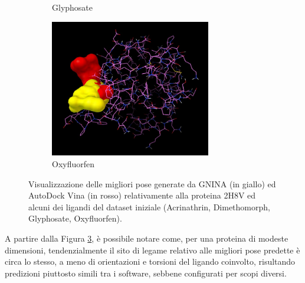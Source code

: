 \begin{figure}[H]
\begin{subfigure}[b]{0.475\textwidth}
        \caption[]%
        {{\small Glyphosate}}    
        \label{fig:2h8v_glyphosate}
    \end{subfigure}
    \hfill
    \begin{subfigure}[b]{0.475\textwidth}   
        \centering 
        \includegraphics[width=\textwidth, height=6cm]{images/2h8v_oxyfluorfen.jpg}
        \caption[]%
        {{\small Oxyfluorfen}}    
        \label{fig:2h8v_oxyfluorfen}
    \end{subfigure}
    \caption[Conformazioni proteina-ligando per la proteina 2H8V]
    {\small Visualizzazione delle migliori pose generate da GNINA (in giallo) ed AutoDock Vina (in rosso) relativamente alla proteina 2H8V ed alcuni dei ligandi del dataset iniziale (Acrinathrin, Dimethomorph, Glyphosate, Oxyfluorfen).} 
    \label{fig:2h8v}
\end{figure}

A partire dalla Figura \ref{fig:2h8v}, è possibile notare come, per una proteina di modeste dimensioni, tendenzialmente il sito di legame relativo alle migliori pose predette è circa lo stesso, a meno di orientazioni e torsioni del ligando coinvolto, risultando predizioni piuttosto simili tra i software, sebbene configurati per scopi diversi.


